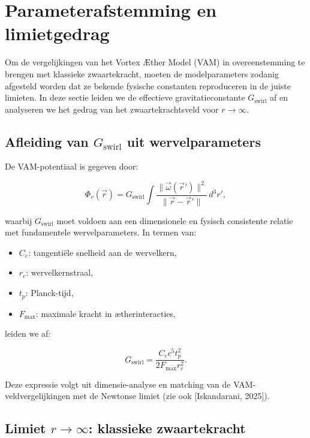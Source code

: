 \section{Parameterafstemming en limietgedrag}

Om de vergelijkingen van het Vortex Æther Model (VAM) in overeenstemming te brengen met klassieke zwaartekracht, moeten de modelparameters zodanig afgesteld worden dat ze bekende fysische constanten reproduceren in de juiste limieten. In deze sectie leiden we de effectieve gravitatieconstante $G_{\text{swirl}}$ af en analyseren we het gedrag van het zwaartekrachtsveld voor $r \to \infty$.

\subsection{Afleiding van $G_{\text{swirl}}$ uit wervelparameters}

De VAM-potentiaal is gegeven door:

\begin{equation}
\Phi_v(\vec{r}) = G_{\text{swirl}} \int \frac{\|\vec{\omega}(\vec{r}')\|^2}{\|\vec{r} - \vec{r}'\|} \, d^3r',
\end{equation}

waarbij $G_{\text{swirl}}$ moet voldoen aan een dimensionele en fysisch consistente relatie met fundamentele wervelparameters. In termen van:

\begin{itemize}
  \item $C_e$: tangentiële snelheid aan de wervelkern,
  \item $r_c$: wervelkernstraal,
  \item $t_p$: Planck-tijd,
  \item $F_{\text{max}}$: maximale kracht in ætherinteracties,
\end{itemize}

leiden we af:

\begin{equation}
G_{\text{swirl}} = \frac{C_e c^5 t_p^2}{2 F_{\text{max}} r_c^2}.
\end{equation}

Deze expressie volgt uit dimensie-analyse en matching van de VAM-veldvergelijkingen met de Newtonse limiet (zie ook [Iskandarani, 2025]).

\subsection{Limiet $r \to \infty$: klassieke zwaartekracht}

